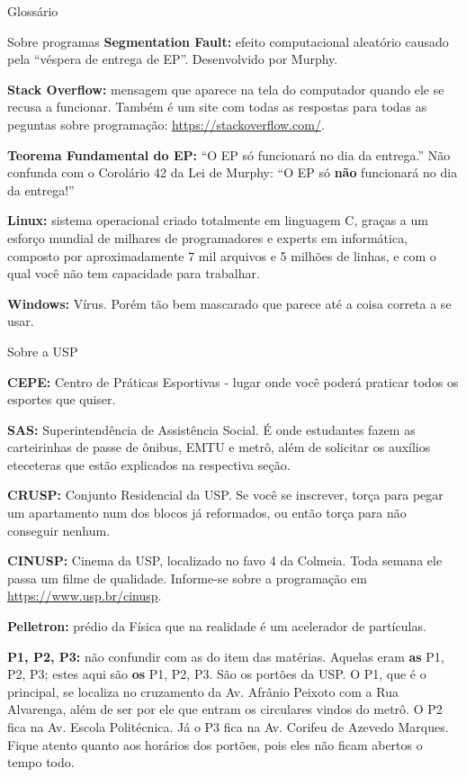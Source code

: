 \begin{secao}{Glossário}
\begin{subsecao}{Sobre programas}
{\bf Segmentation Fault:} efeito computacional aleatório causado pela ``véspera
de entrega de EP''. Desenvolvido por Murphy.

{\bf Stack Overflow:} mensagem que aparece na tela do computador
quando ele se recusa a funcionar. Também é um site com todas as respostas
para todas as peguntas sobre programação: \url{https://stackoverflow.com/}.

{\bf Teorema Fundamental do EP:} ``O EP só funcionará no dia da entrega.'' Não
confunda com o Corolário 42 da Lei de Murphy: ``O EP só {\bf não} funcionará no
dia da entrega!''

{\bf Linux:} sistema operacional criado totalmente em linguagem C, graças a um
esforço mundial de milhares de programadores e experts em informática, composto
por aproximadamente 7 mil arquivos e 5 milhões de linhas, e com o qual você não
tem capacidade para trabalhar.

{\bf Windows:} Vírus. Porém tão bem mascarado que parece até a coisa correta a
se usar.
\end{subsecao}

\begin{subsecao}{Sobre a USP}

{\bf CEPE:} Centro de Práticas Esportivas - lugar onde você poderá praticar
todos os esportes que quiser.

{\bf SAS:} Superintendência de Assistência Social. É onde estudantes fazem as
carteirinhas de passe de ônibus, EMTU e metrô, além de solicitar os auxílios
eteceteras que estão explicados na respectiva seção.

{\bf CRUSP:} Conjunto Residencial da USP. Se você se inscrever, torça para
pegar um apartamento num dos blocos já reformados, ou então torça para não
conseguir nenhum.



{\bf CINUSP:} Cinema da USP, localizado no favo 4 da Colmeia. Toda semana ele
passa um filme de qualidade. Informe-se sobre a programação em
\url{https://www.usp.br/cinusp}.

{\bf Pelletron:} prédio da Física que na realidade é um acelerador de
partículas.

{\bf P1, P2, P3:} não confundir com as do item das matérias. Aquelas eram
{\bf as} P1, P2, P3; estes aqui são {\bf os} P1, P2, P3. São os portões da USP.
O P1, que é o principal, se localiza no cruzamento da Av. Afrânio Peixoto com a
Rua Alvarenga, além de ser por ele que entram os circulares vindos do metrô.
O P2 fica na Av. Escola Politécnica. Já o P3 fica na Av. Corifeu de Azevedo
Marques. Fique atento quanto aos horários dos portões, pois eles não ficam
abertos o tempo todo.


\end{subsecao}
\end{secao}
